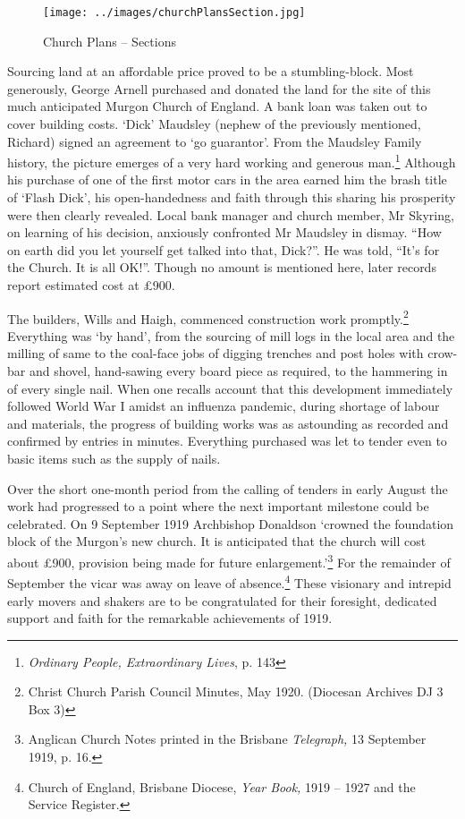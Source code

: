 \begin{figure}
\begin{center}
\texttt{[image: ../images/churchPlansSection.jpg]}
\caption{Church Plans -- Sections}
\end{center}
\end{figure}




Sourcing land at an affordable price proved to be a stumbling-block. Most generously, George Arnell purchased and donated the land for the site of this much anticipated Murgon Church of England. A bank loan was taken out to cover building costs. `Dick' Maudsley (nephew of the previously mentioned, Richard) signed an agreement to `go guarantor'. From the Maudsley Family history, the picture emerges of a very hard working and generous man.\footnote{\emph{Ordinary People, Extraordinary Lives}, p. 143} Although his purchase of one of the first motor cars in the area earned him the brash title of `Flash Dick', his open-handedness and faith through this sharing his prosperity were then clearly revealed. Local bank manager and church member, Mr Skyring, on learning of his decision, anxiously confronted Mr Maudsley in dismay. ``How on earth did you let yourself get talked into that, Dick?''. He was told, ``It's for the Church. It is all OK!''. Though no amount is mentioned here, later records report estimated cost at \pounds900.


The builders, Wills and Haigh, commenced construction work promptly.\footnote{Christ Church Parish Council Minutes, May 1920. (Diocesan Archives DJ 3 Box 3)} Everything was `by hand', from the sourcing of mill logs in the local area and the milling of same to the coal-face jobs of digging trenches and post holes with crow-bar and shovel, hand-sawing every board piece as required, to the hammering in of every single nail. When one recalls account that this development immediately followed World War I amidst an influenza pandemic, during shortage of labour and materials, the progress of building works was as astounding as recorded and confirmed by entries in minutes. Everything purchased was let to tender even to basic items such as the supply of nails.


Over the short one-month period from the calling of tenders in early August the work had progressed to a point where the next important milestone could be celebrated. On 9 September 1919 Archbishop Donaldson `crowned the foundation block of the Murgon's new church. It is anticipated that the church will cost about \pounds900, provision being made for future enlargement.'\footnote{Anglican Church Notes printed in the Brisbane \emph{Telegraph,} 13 September 1919, p. 16.} For the remainder of September the vicar was away on leave of absence.\footnote{Church of England, Brisbane Diocese, \emph{Year Book,} 1919 -- 1927 and the Service Register.} These visionary and intrepid early movers and shakers are to be congratulated for their foresight, dedicated support and faith for the remarkable achievements of 1919.


